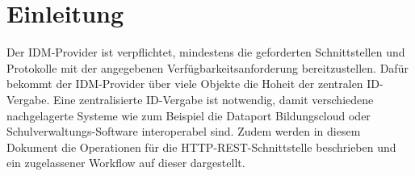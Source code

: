 \chapter{Einleitung}
Der IDM-Provider ist verpflichtet, mindestens die geforderten Schnittstellen und Protokolle mit der angegebenen Verfügbarkeitsanforderung bereitzustellen.
Dafür bekommt der IDM-Provider über viele Objekte die Hoheit der zentralen ID-Vergabe.
Eine zentralisierte ID-Vergabe ist notwendig, damit verschiedene nachgelagerte Systeme wie zum Beispiel die Dataport Bildungscloud oder Schulverwaltungs-Software interoperabel sind.
Zudem werden in diesem Dokument die Operationen für die HTTP-REST-Schnittstelle beschrieben und ein zugelassener Workflow auf dieser dargestellt.

